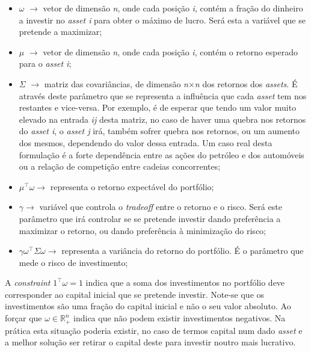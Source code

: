 \documentclass[a4paper]{IEEEtran}
\begin{document}
\begin{itemize}
\item  $\omega$ $\rightarrow$ vetor de dimensão \textit{n}, onde cada posição \textit{i}, contém a fração do dinheiro a investir no \textit{asset i} para obter o máximo de lucro. Será esta a variável que se pretende a maximizar;

\item $\mu$ $\rightarrow$ vetor de dimensão \textit{n}, onde cada posição \textit{i}, contém o retorno esperado para o \textit{asset i};

\item $\Sigma$ $\rightarrow$ matriz das covariâncias, de dimensão \textit{n}$\times$\textit{n} dos retornos dos \textit{assets}. É através deste parâmetro que se representa a influência que cada \textit{asset} tem nos restantes e vice-versa. Por exemplo, é de esperar que tendo um valor muito elevado na entrada \textit{ij} desta matriz, no caso de haver uma quebra nos retornos do \textit{asset i}, o \textit{asset j} irá, também sofrer quebra nos retornos, ou um aumento dos mesmos, dependendo do valor dessa entrada. Um caso real desta formulação é a forte dependência entre as ações do petróleo e dos automóveis ou a relação de competição entre cadeias concorrentes;

\item $\mu^\top \omega \rightarrow$ representa o retorno expectável do portfólio;

\item $\gamma \rightarrow$ variável que controla o \textit{tradeoff} entre o retorno e o risco. Será este parâmetro que irá controlar se se pretende investir dando preferência a maximizar o retorno, ou dando preferência à minimização do risco;

\item $\gamma \omega^\top \Sigma \omega \rightarrow$ representa a variância do retorno do portfólio. É o parâmetro que mede o risco de investimento;
\end{itemize}

A \textit{constraint} $1^\top \omega = 1$ indica que a soma dos investimentos no portfólio deve corresponder ao capital inicial que se pretende investir. Note-se que os investimentos são uma fração do capital inicial e não o seu valor absoluto. Ao forçar que $\omega \in \mathbb{R}_+^n$ indica que não podem existir investimentos negativos. 
Na prática esta situação poderia existir, no caso de termos capital num dado \textit{asset} e a melhor solução ser retirar o capital deste para investir noutro mais lucrativo.
\end{document}
